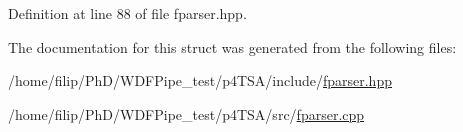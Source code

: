 Definition at line 88 of file fparser.\+hpp.



The documentation for this struct was generated from the following files\+:\begin{DoxyCompactItemize}
\item 
/home/filip/\+Ph\+D/\+W\+D\+F\+Pipe\+\_\+test/p4\+T\+S\+A/include/\hyperlink{fparser_8hpp}{fparser.\+hpp}\item 
/home/filip/\+Ph\+D/\+W\+D\+F\+Pipe\+\_\+test/p4\+T\+S\+A/src/\hyperlink{fparser_8cpp}{fparser.\+cpp}\end{DoxyCompactItemize}
